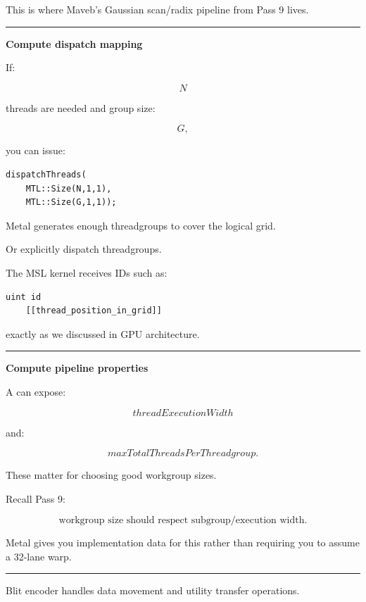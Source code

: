This is where Maveb's Gaussian scan/radix pipeline from Pass 9 lives.

\begin{center}\rule{0.5\linewidth}{0.5pt}\end{center}

\textbf{Compute dispatch mapping}

If:

\[
N
\]

threads are needed and group size:

\[
G,
\]

you can issue:

\begin{verbatim}
dispatchThreads(
    MTL::Size(N,1,1),
    MTL::Size(G,1,1));
\end{verbatim}

Metal generates enough threadgroups to cover the logical grid.

Or explicitly dispatch threadgroups.

The MSL kernel receives IDs such as:

\begin{verbatim}
uint id
    [[thread_position_in_grid]]
\end{verbatim}

exactly as we discussed in GPU architecture.

\begin{center}\rule{0.5\linewidth}{0.5pt}\end{center}

\textbf{Compute pipeline properties}

A  can expose:

\[
threadExecutionWidth
\]

and:

\[
maxTotalThreadsPerThreadgroup.
\]

These matter for choosing good workgroup sizes.

Recall Pass 9:

\[
\boxed{
\text{workgroup size should respect subgroup/execution width}.
}
\]

Metal gives you implementation data for this rather than requiring you to assume a 32-lane warp.

\begin{center}\rule{0.5\linewidth}{0.5pt}\end{center}

\textbf{}

Blit encoder handles data movement and utility transfer operations.

